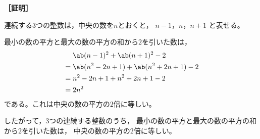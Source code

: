 \documentclass[article,paper=b6]{jlreq}
\begin{document}
\noindent\textbf{［証明］}

連続する3つの整数は，中央の数を$n$とおくと，
$n − 1$，$n$，$n + 1$ と表せる。

最小の数の平方と最大の数の平方の和から$2$を引いた数は，
\begin{align*}
&\ab(n - 1)^{2} + \ab(n + 1)^{2} - 2\\
{}={} &\ab({n}^{2} - 2n + 1) + \ab({n}^{2} + 2n + 1) - 2\\
{}={} &{n}^{2} - 2n + 1 + {n}^{2} + 2n + 1 - 2\\
{}={} &2{n}^{2}
\end{align*}
である。これは中央の数の平方の$2$倍に等しい。

したがって，3つの連続する整数のうち，
最小の数の平方と最大の数の平方の和から$2$を引いた数は，
中央の数の平方の$2$倍に等しい。
\end{document}
